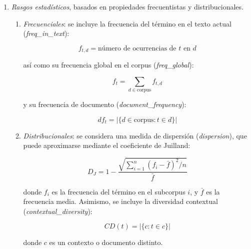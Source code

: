 \begin{enumerate}
\begin{enumerate}
    
  \end{enumerate}

  \item \emph{Rasgos estadísticos}, basados en propiedades frecuentistas y distribucionales.

  \begin{enumerate}
    \item \emph{Frecuenciales}: se incluye la frecuencia del término en el texto actual (\emph{freq\_in\_text}):

    \begin{equation}
    f_{t,d} = \text{número de ocurrencias de } t \text{ en } d
    \end{equation}

    así como su frecuencia global en el corpus (\emph{freq\_global}):

    \begin{equation}
    f_t = \sum_{d \in \text{corpus}} f_{t,d}
    \end{equation}

    y su frecuencia de documento (\emph{document\_frequency}):

    \begin{equation}
    df_t = \left| \{ d \in \text{corpus} : t \in d \} \right|
    \end{equation}

    \item \emph{Distribucionales}: se considera una medida de dispersión (\emph{dispersion}), que puede aproximarse mediante el coeficiente de Juilland:

    \begin{equation}
    D_J = 1 - \frac{\sqrt{\sum_{i=1}^{n} (f_i - \bar{f})^2 / n}}{\bar{f}}
    \end{equation}

    donde \( f_i \) es la frecuencia del término en el subcorpus \( i \), y \( \bar{f} \) es la frecuencia media. Asimismo, se incluye la diversidad contextual (\emph{contextual\_diversity}):

    \begin{equation}
    CD(t) = \left| \{ c : t \in c \} \right|
    \end{equation}

    donde \( c \) es un contexto o documento distinto.
  \end{enumerate}


\end{enumerate}
